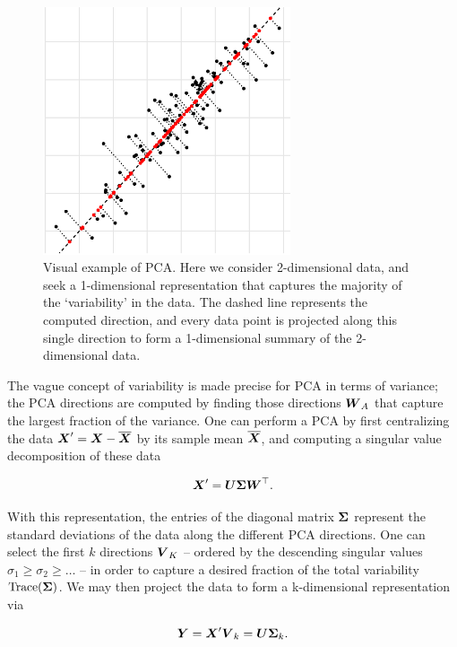 \documentclass{article}
\begin{document}
\begin{figure}[!ht]
  \centering
  \includegraphics[width=0.65\textwidth]{../../images/pca3}
  \caption{Visual example of PCA. Here we consider 2-dimensional data, and seek
    a 1-dimensional representation that captures the majority of the
    `variability' in the data. The dashed line represents the computed
    direction, and every data point is projected along this single direction to
    form a 1-dimensional summary of the 2-dimensional data.}
  \label{fig:pca}
\end{figure}

The vague concept of variability is made precise for PCA in terms of variance;
the PCA directions are computed by finding those directions $\boldsymbol{W}_A$ that capture
the largest fraction of the variance. One can perform a PCA by first
centralizing the data $\boldsymbol{X}' = \boldsymbol{X} - \overline{\boldsymbol{X}}$ by its sample mean
$\overline{\boldsymbol{X}}$, and computing a singular value decomposition of these data

\begin{equation*}
  \boldsymbol{X}' = \boldsymbol{U}\boldsymbol{\Sigma}\boldsymbol{W}^{\top}.
\end{equation*}

\noindent With this representation, the entries of the diagonal matrix
$\boldsymbol{\Sigma}$ represent the standard deviations of the data along the different PCA
directions. One can select the first $k$ directions $\boldsymbol{V}_K$ -- ordered by the
descending singular values $\sigma_1 \geq \sigma_2 \geq \dots$ -- in order to
capture a desired fraction of the total variability $\text{Trace}(\boldsymbol{\Sigma})$. We
may then project the data to form a k-dimensional representation via

\begin{equation*}
  \boldsymbol{Y} = \boldsymbol{X}'\boldsymbol{V}_k = \boldsymbol{U}\boldsymbol{\Sigma}_k.
\end{equation*}
\end{document}
